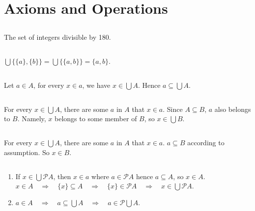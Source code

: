 \chapter{Axioms and Operations}

\section{}
The set of integers divisible by 180.


\section{}
$ \bigcup\{\{a\}, \{b\}\} = \bigcup\{\{a,b\}\} = \{a,b\} $.


\section{}
Let $ a \in A $, for every $ x \in a $, we have $ x \in \bigcup A $.
Hence $ a \subseteq \bigcup A $.


\section{}
For every $ x \in \bigcup A $, there are some $a$ in $A$ that $ x \in a $.
Since $ A \subseteq B $, $a$ also belongs to $B$. Namely, $x$ belongs to 
some member of $B$, so $ x \in \bigcup B $.


\section{}
For every $ x \in \bigcup A $, there are some $a$ in $A$ that $ x \in a $.
$ a \subseteq B $ according to assumption. So $ x \in B $.


\section{}
\begin{enumerate}
  \item 
  If $ x \in \bigcup\mathscr{P}A $, then $ x \in a $ where $ a \in \mathscr{P}A $ 
  hence $ a \subseteq A $, so $ x \in A $. \\
  $ x \in A \quad \Rightarrow \quad  \{x\} \subseteq A  \quad \Rightarrow \quad 
   \{x\} \in \mathscr{P}A  \quad \Rightarrow \quad   x \in \bigcup\mathscr{P}A $.
  
  \item 
  $ a \in A  \quad \Rightarrow \quad  a \subseteq \bigcup A 
    \quad \Rightarrow \quad  a \in \mathscr{P}\bigcup A $.
\end{enumerate}


